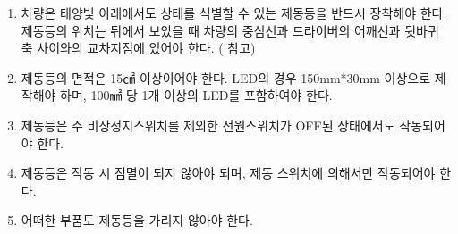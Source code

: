 \documentclass[final,a4paper,10pt]{report}
\begin{document}
\begin{enumerate}
\begin{enumerate}
      \item\label{rule:formula-technical.brake-light.visible-in-sunlight} 차량은 태양빛 아래에서도 상태를 식별할 수 있는 제동등을 반드시 장착해야 한다. 제동등의 위치는 뒤에서 보았을 때 차량의 중심선과 드라이버의 어깨선과 뒷바퀴 축 사이와의 교차지점에 있어야 한다. ( 참고)
      \item\label{rule:formula-technical.brake-light.min-area-led-density} 제동등의 면적은 15㎠ 이상이어야 한다. LED의 경우 150mm*30mm 이상으로 제작해야 하며, 100㎟ 당 1개 이상의 LED를 포함하여야 한다.
      \item\label{rule:formula-technical.brake-light.independent-of-main-switch} 제동등은 주 비상정지스위치를 제외한 전원스위치가 OFF된 상태에서도 작동되어야 한다.
      \item\label{rule:formula-technical.brake-light.no-flash-switch-only} 제동등은 작동 시 점멸이 되지 않아야 되며, 제동 스위치에 의해서만 작동되어야 한다.
      \item\label{rule:formula-technical.brake-light.unobstructed-view} 어떠한 부품도 제동등을 가리지 않아야 한다.
    \end{enumerate}

\end{enumerate}
\end{document}
